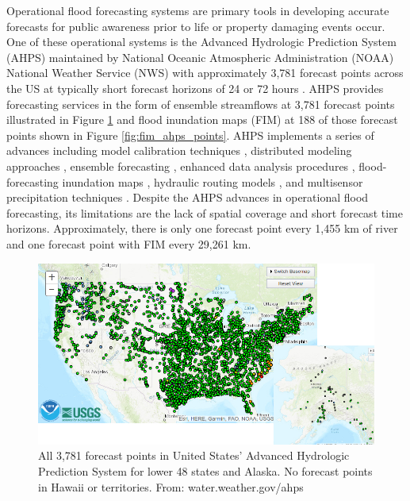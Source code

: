 Operational flood forecasting systems are primary tools in developing accurate forecasts for public awareness prior to life or property damaging events occur. 
One of these operational systems is the Advanced Hydrologic Prediction System (AHPS) maintained by National Oceanic Atmospheric Administration (NOAA) National Weather Service (NWS) with approximately 3,781 forecast points across the US at typically short forecast horizons of 24 or 72 hours \cite{mcenery2005noaa}.
AHPS provides forecasting services in the form of ensemble streamflows at 3,781 forecast points illustrated in Figure \ref{fig:all_ahps_points} and flood inundation maps (FIM) at 188 of those forecast points shown in Figure \ref{fig:fim_ahps_points}.
AHPS implements a series of advances including model calibration techniques \cite{zhang2003hydrologic,hogue2003multi,duan2003global,gupta2003advances,parada2003multi}, distributed modeling approaches \cite{reed2004overall,koren2004hydrology,duan2002results}, ensemble forecasting \cite{day1985extended,seo2000simulation,mullusky2002simplified,herr2002simplified}, enhanced data analysis procedures \cite{mcenery2005noaa}, flood-forecasting inundation maps \cite{cajina2002fldview}, hydraulic routing models \cite{fread1973technique,cajina2002fldview}, and multisensor precipitation techniques \cite{breidenbach1999accounting,kondragunta2001outlier,seo2002real,bonnin1996noaa}.
Despite the AHPS advances in operational flood forecasting, its limitations are the lack of spatial coverage and short forecast time horizons.
Approximately, there is only one forecast point every 1,455 km of river and one forecast point with FIM every 29,261 km.

\begin{figure}[h!]
\centering
\includegraphics[scale=2.0]{figs/ahps_all_forecast_points.jpg}
\caption{All 3,781 forecast points in United States' Advanced Hydrologic Prediction System for lower 48 states and Alaska. No forecast points in Hawaii or territories. From: water.weather.gov/ahps}
\label{fig:all_ahps_points}
\end{figure}

